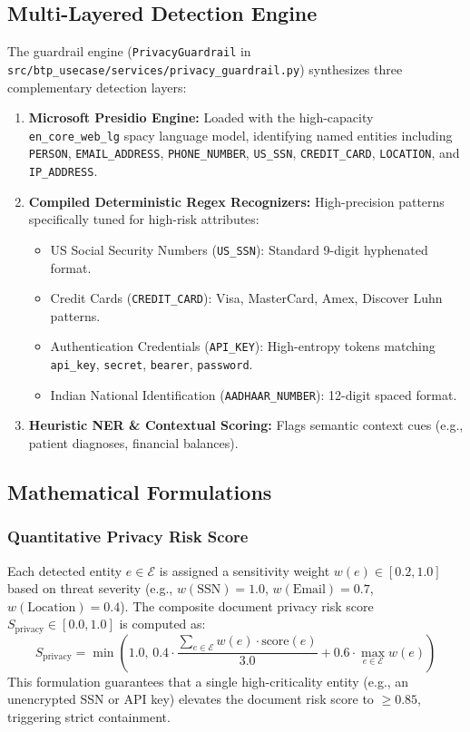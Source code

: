 \documentclass[10pt,a4paper]{article}
\begin{document}
\subsection{Multi-Layered Detection Engine}
The guardrail engine (\texttt{PrivacyGuardrail} in \texttt{src/btp\_usecase/services/privacy\_guardrail.py}) synthesizes three complementary detection layers:
\begin{enumerate}
    \item \textbf{Microsoft Presidio Engine:} Loaded with the high-capacity \texttt{en\_core\_web\_lg} spacy language model, identifying named entities including \texttt{PERSON}, \texttt{EMAIL\_ADDRESS}, \texttt{PHONE\_NUMBER}, \texttt{US\_SSN}, \texttt{CREDIT\_CARD}, \texttt{LOCATION}, and \texttt{IP\_ADDRESS}.
    \item \textbf{Compiled Deterministic Regex Recognizers:} High-precision patterns specifically tuned for high-risk attributes:
    \begin{itemize}
        \item US Social Security Numbers (\texttt{US\_SSN}): Standard 9-digit hyphenated format.
        \item Credit Cards (\texttt{CREDIT\_CARD}): Visa, MasterCard, Amex, Discover Luhn patterns.
        \item Authentication Credentials (\texttt{API\_KEY}): High-entropy tokens matching \texttt{api\_key}, \texttt{secret}, \texttt{bearer}, \texttt{password}.
        \item Indian National Identification (\texttt{AADHAAR\_NUMBER}): 12-digit spaced format.
    \end{itemize}
    \item \textbf{Heuristic NER \& Contextual Scoring:} Flags semantic context cues (e.g., patient diagnoses, financial balances).
\end{enumerate}

\subsection{Mathematical Formulations}

\subsubsection{Quantitative Privacy Risk Score}
Each detected entity $e \in \mathcal{E}$ is assigned a sensitivity weight $w(e) \in [0.2, 1.0]$ based on threat severity (e.g., $w(\text{SSN}) = 1.0$, $w(\text{Email}) = 0.7$, $w(\text{Location}) = 0.4$). The composite document privacy risk score $S_{\text{privacy}} \in [0.0, 1.0]$ is computed as:
\begin{equation}
S_{\text{privacy}} = \min\left(1.0, \, 0.4 \cdot \frac{\sum_{e \in \mathcal{E}} w(e) \cdot \text{score}(e)}{3.0} + 0.6 \cdot \max_{e \in \mathcal{E}} w(e)\right)
\end{equation}
This formulation guarantees that a single high-criticality entity (e.g., an unencrypted SSN or API key) elevates the document risk score to $\ge 0.85$, triggering strict containment.
\end{document}
